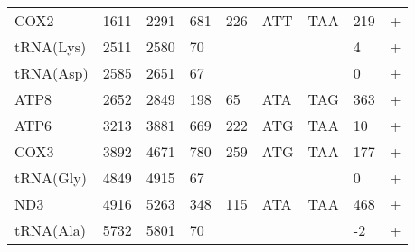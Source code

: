 \documentclass[../DISSERTACAO_MAIN.tex]{subfiles}
\begin{document}
\begin{longtable}{llllllllllllllllllllll}
			COX2         & 1611           & \multicolumn{2}{l}{2291}  & \multicolumn{2}{l}{681}        & \multicolumn{3}{l}{226}                       & \multicolumn{3}{l}{ATT}           & \multicolumn{3}{l}{TAA}   & \multicolumn{3}{l}{219}         & \multicolumn{4}{l}{+}                  \\
			tRNA(Lys)    & 2511           & \multicolumn{2}{l}{2580}  & \multicolumn{2}{l}{70}         & \multicolumn{3}{l}{}                          & \multicolumn{3}{l}{}              & \multicolumn{3}{l}{}      & \multicolumn{3}{l}{4}           & \multicolumn{4}{l}{+}                  \\
			tRNA(Asp)    & 2585           & \multicolumn{2}{l}{2651}  & \multicolumn{2}{l}{67}         & \multicolumn{3}{l}{}                          & \multicolumn{3}{l}{}              & \multicolumn{3}{l}{}      & \multicolumn{3}{l}{0}           & \multicolumn{4}{l}{+}                  \\
			ATP8         & 2652           & \multicolumn{2}{l}{2849}  & \multicolumn{2}{l}{198}        & \multicolumn{3}{l}{65}                        & \multicolumn{3}{l}{ATA}           & \multicolumn{3}{l}{TAG}   & \multicolumn{3}{l}{363}         & \multicolumn{4}{l}{+}                  \\
			ATP6         & 3213           & \multicolumn{2}{l}{3881}  & \multicolumn{2}{l}{669}        & \multicolumn{3}{l}{222}                       & \multicolumn{3}{l}{ATG}           & \multicolumn{3}{l}{TAA}   & \multicolumn{3}{l}{10}          & \multicolumn{4}{l}{+}                  \\
			COX3         & 3892           & \multicolumn{2}{l}{4671}  & \multicolumn{2}{l}{780}        & \multicolumn{3}{l}{259}                       & \multicolumn{3}{l}{ATG}           & \multicolumn{3}{l}{TAA}   & \multicolumn{3}{l}{177}         & \multicolumn{4}{l}{+}                  \\
			tRNA(Gly)    & 4849           & \multicolumn{2}{l}{4915}  & \multicolumn{2}{l}{67}         & \multicolumn{3}{l}{}                          & \multicolumn{3}{l}{}              & \multicolumn{3}{l}{}      & \multicolumn{3}{l}{0}           & \multicolumn{4}{l}{+}                  \\
			ND3          & 4916           & \multicolumn{2}{l}{5263}  & \multicolumn{2}{l}{348}        & \multicolumn{3}{l}{115}                       & \multicolumn{3}{l}{ATA}           & \multicolumn{3}{l}{TAA}   & \multicolumn{3}{l}{468}         & \multicolumn{4}{l}{+}                  \\
			tRNA(Ala)    & 5732           & \multicolumn{2}{l}{5801}  & \multicolumn{2}{l}{70}         & \multicolumn{3}{l}{}                          & \multicolumn{3}{l}{}              & \multicolumn{3}{l}{}      & \multicolumn{3}{l}{-2}          & \multicolumn{4}{l}{+}                  \\

\end{longtable}
\end{document}
